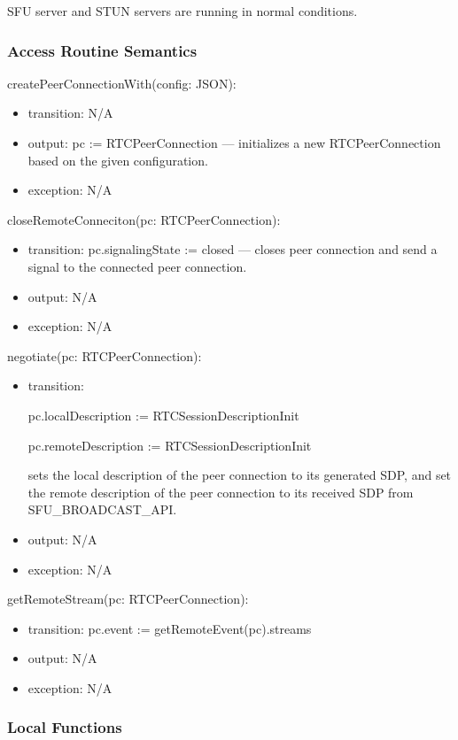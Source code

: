\documentclass[12pt, titlepage]{article}
\begin{document}
SFU server and STUN servers are running in normal conditions.

\subsubsection{Access Routine Semantics}

\noindent createPeerConnectionWith(config: JSON):
\begin{itemize}
\item transition: N/A
\item output: pc := RTCPeerConnection --- initializes a new RTCPeerConnection based
  on the given configuration.
\item exception: N/A
\end{itemize}


\noindent closeRemoteConneciton(pc: RTCPeerConnection):
\begin{itemize}
\item transition: pc.signalingState := closed --- closes peer connection and send a
  signal to the connected peer connection.
\item output: N/A
\item exception: N/A
\end{itemize}


\noindent negotiate(pc: RTCPeerConnection):
\begin{itemize}
\item transition:

  pc.localDescription := RTCSessionDescriptionInit

  pc.remoteDescription := RTCSessionDescriptionInit

  sets the local description of the peer connection to its generated SDP, and
  set the remote description of the peer connection to its received SDP from
  SFU\_BROADCAST\_API.
\item output: N/A
\item exception: N/A
\end{itemize}


\noindent getRemoteStream(pc: RTCPeerConnection):
\begin{itemize}
\item transition: pc.event := getRemoteEvent(pc).streams
\item output: N/A
\item exception: N/A
\end{itemize}

\subsubsection{Local Functions}
\end{document}
